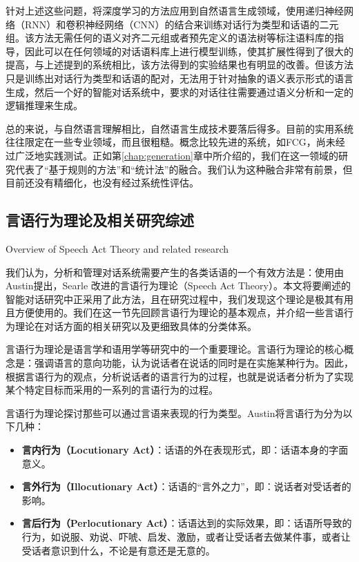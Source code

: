 针对上述这些问题，\cite{Wen2015}将深度学习的方法应用到自然语言生成领域，使用递归神经网络（RNN）和卷积神经网络（CNN）的结合来训练对话行为类型和话语的二元组。该方法无需任何的语义对齐二元组或者预先定义的语法树等标注语料库的指导，因此可以在任何领域的对话语料库上进行模型训练，使其扩展性得到了很大的提高，与上述提到的系统相比，该方法得到的实验结果也有明显的改善。但该方法只是训练出对话行为类型和话语的配对，无法用于针对抽象的语义表示形式的语言生成，然后一个好的智能对话系统中，要求的对话往往需要通过语义分析和一定的逻辑推理来生成。

总的来说，与自然语言理解相比，自然语言生成技术要落后得多。目前的实用系统往往限定在一些专业领域，而且很粗糙。概念比较先进的系统，如FCG，尚未经过广泛地实践测试。正如第\ref{chap:generation}章中所介绍的，我们在这一领域的研究代表了“基于规则的方法”和“统计法”的融合。我们认为这种融合非常有前景，但目前还没有精细化，也没有经过系统性评估。

\subsection{言语行为理论及相关研究综述}{Overview of Speech Act Theory and related research}
\label{sec:speechAct}

我们认为，分析和管理对话系统需要产生的各类话语的一个有效方法是：使用由Austin\cite{Austin2005}提出，Searle\cite{Searle1969} 改进的言语行为理论（Speech Act Theory）。本文将要阐述的智能对话研究中正采用了此方法，且在研究过程中，我们发现这个理论是极其有用且方便使用的。我们在这一节先回顾言语行为理论的基本观点，并介绍一些言语行为理论在对话方面的相关研究以及更细致具体的分类体系。

言语行为理论是语言学和语用学等研究中的一个重要理论。言语行为理论的核心概念是：强调语言的意向功能，认为说话者在说话的同时是在实施某种行为。因此，根据言语行为的观点，分析说话者的语言行为的过程，也就是说话者分析为了实现某个特定目标而采用的一系列的言语行为的过程。

言语行为理论探讨那些可以通过言语来表现的行为类型。Austin\cite{Austin2005}将言语行为分为以下几种：

\begin{itemize}
\item {\bf 言内行为（Locutionary Act）}：话语的外在表现形式，即：话语本身的字面意义。
\item {\bf 言外行为（Illocutionary Act）}：话语的“言外之力”，即：说话者对受话者的影响。
\item {\bf 言后行为（Perlocutionary Act）}：话语达到的实际效果，即：话语所导致的行为，如说服、劝说、吓唬、启发、激励，或者让受话者去做某件事，或者让受话者意识到什么，不论是有意还是无意的。
\end{itemize}

